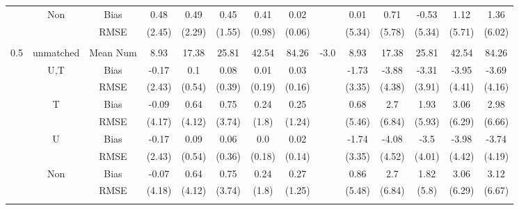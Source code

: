 \begin{tabular}{@{\extracolsep{5pt}}lc|cccccc|lccccc}
 & Non & Bias & 0.48 & 0.49 & 0.45 & 0.41 & 0.02 &  & 0.01 & 0.71 & -0.53 & 1.12 & 1.36 \\
 &  & RMSE & (2.45) & (2.29) & (1.55) & (0.98) & (0.06) &  & (5.34) & (5.78) & (5.34) & (5.71) & (6.02) \\
 &  &  &  &  &  &  &  &  &  &  &  &  &  \\
0.5 & unmatched & Mean Num & 8.93 & 17.38 & 25.81 & 42.54 & 84.26 & -3.0 & 8.93 & 17.38 & 25.81 & 42.54 & 84.26 \\
 & U,T & Bias & -0.17 & 0.1 & 0.08 & 0.01 & 0.03 &  & -1.73 & -3.88 & -3.31 & -3.95 & -3.69 \\
 &  & RMSE & (2.43) & (0.54) & (0.39) & (0.19) & (0.16) &  & (3.35) & (4.38) & (3.91) & (4.41) & (4.16) \\
 & T & Bias & -0.09 & 0.64 & 0.75 & 0.24 & 0.25 &  & 0.68 & 2.7 & 1.93 & 3.06 & 2.98 \\
 &  & RMSE & (4.17) & (4.12) & (3.74) & (1.8) & (1.24) &  & (5.46) & (6.84) & (5.93) & (6.29) & (6.66) \\
 & U & Bias & -0.17 & 0.09 & 0.06 & 0.0 & 0.02 &  & -1.74 & -4.08 & -3.5 & -3.98 & -3.74 \\
 &  & RMSE & (2.43) & (0.54) & (0.36) & (0.18) & (0.14) &  & (3.35) & (4.52) & (4.01) & (4.42) & (4.19) \\
 & Non & Bias & -0.07 & 0.64 & 0.75 & 0.24 & 0.27 &  & 0.86 & 2.7 & 1.82 & 3.06 & 3.12 \\
 &  & RMSE & (4.18) & (4.12) & (3.74) & (1.8) & (1.25) &  & (5.48) & (6.84) & (5.8) & (6.29) & (6.67) \\
 &  &  &  &  &  &  &  &  &  &  &  &  &  \\
\hline 
\bottomrule 
\end{tabular}
